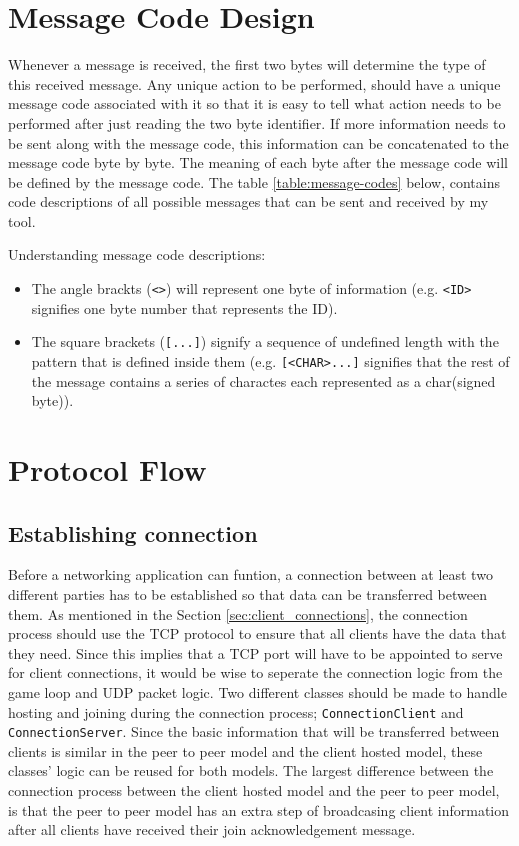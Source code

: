 \section{Message Code Design}
Whenever a message is received, the first two bytes will determine the type of this received message. Any unique action to be performed, should have a unique message code associated with it so that it is easy to tell what action needs to be performed after just reading the two byte identifier. If more information needs to be sent along with the message code, this information can be concatenated to the message code byte by byte. The meaning of each byte after the message code will be defined by the message code. The table \ref{table:message-codes} below, contains code descriptions of all possible messages that can be sent and received by my tool.

Understanding message code descriptions:
\begin{itemize}
\item The angle brackts (\lstinline{<>}) will represent one byte of information (e.g. \lstinline{<ID>} signifies one byte number that represents the ID).
\item The square brackets (\lstinline{[...]}) signify a sequence of undefined length with the pattern that is defined inside them (e.g. \lstinline{[<CHAR>...]} signifies that the rest of the message contains a series of charactes each represented as a char(signed byte)).
\end{itemize}
\vfill


\newpage

\section{Protocol Flow}

\subsection{Establishing connection}
Before a networking application can funtion, a connection between at least two different parties has to be established so that data can be transferred between them. As mentioned in the Section \ref{sec:client_connections}, the connection process should use the TCP protocol to ensure that all clients have the data that they need. Since this implies that a TCP port will have to be appointed to serve for client connections, it would be wise to seperate the connection logic from the game loop and UDP packet logic.
Two different classes should be made to handle hosting and joining during the connection process; \lstinline{ConnectionClient} and \lstinline{ConnectionServer}. Since the basic information that will be transferred between clients is similar in the peer to peer model and the client hosted model, these classes' logic can be reused for both models. The largest difference between the connection process between the client hosted model and the peer to peer model, is that the peer to peer model has an extra step of broadcasing client information after all clients have received their join acknowledgement message.

